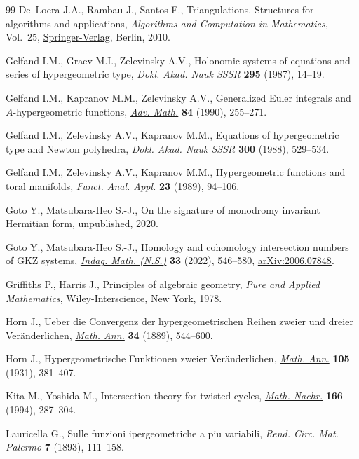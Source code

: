 \documentclass[pdftex]{sigma}
\numberwithin{equation}{section}
\begin{document}
\begin{thebibliography}{99}
De~Loera J.A., Rambau J., Santos F., Triangulations. Structures for algorithms
 and applications, \textit{Algorithms and Computation in Mathematics},
 Vol.~25, \href{https://doi.org/10.1007/978-3-642-12971-1}{Springer-Verlag}, Berlin, 2010.

Gelfand I.M., Graev M.I., Zelevinsky A.V., Holonomic systems of equations and
 series of hypergeometric type, \textit{Dokl. Akad. Nauk SSSR} \textbf{295}
 (1987), 14--19.

Gelfand I.M., Kapranov M.M., Zelevinsky A.V., Generalized {E}uler integrals and
 {$A$}-hypergeometric functions, \href{https://doi.org/10.1016/0001-8708(90)90048-R}{\textit{Adv. Math.}} \textbf{84} (1990),
 255--271.

Gelfand I.M., Zelevinsky A.V., Kapranov M.M., Equations of hypergeometric type
 and {N}ewton polyhedra, \textit{Dokl. Akad. Nauk SSSR} \textbf{300} (1988),
 529--534.

Gelfand I.M., Zelevinsky A.V., Kapranov M.M., Hypergeometric functions and
 toral manifolds, \href{https://doi.org/10.1007/BF01078777}{\textit{Funct. Anal. Appl.}} \textbf{23} (1989), 94--106.

Goto Y., Matsubara-Heo S.-J., On the signature of monodromy invariant Hermitian
 form, {u}npublished, 2020.

Goto Y., Matsubara-Heo S.-J., Homology and cohomology intersection numbers of
 {GKZ} systems, \href{https://doi.org/10.1016/j.indag.2021.12.002}{\textit{Indag. Math. (N.S.)}} \textbf{33} (2022), 546--580,
 \href{https://arxiv.org/abs/2006.07848}{arXiv:2006.07848}.

Griffiths P., Harris J., Principles of algebraic geometry, \textit{Pure and Applied
 Mathematics}, Wiley-Interscience, New York, 1978.

Horn J., Ueber die {C}onvergenz der hypergeometrischen {R}eihen zweier und
 dreier {V}er\"anderlichen, \href{https://doi.org/10.1007/BF01443681}{\textit{Math. Ann.}} \textbf{34} (1889), 544--600.

Horn J., Hypergeometrische {F}unktionen zweier {V}er\"anderlichen,
 \href{https://doi.org/10.1007/BF01455825}{\textit{Math. Ann.}} \textbf{105} (1931), 381--407.

Kita M., Yoshida M., Intersection theory for twisted cycles, \href{https://doi.org/10.1002/mana.19941660122}{\textit{Math.
 Nachr.}} \textbf{166} (1994), 287--304.

Lauricella G., Sulle funzioni ipergeometriche a piu variabili, \textit{Rend.
 Circ. Mat. Palermo} \textbf{7} (1893), 111--158.

\end{thebibliography}\LastPageEnding
\end{document}
